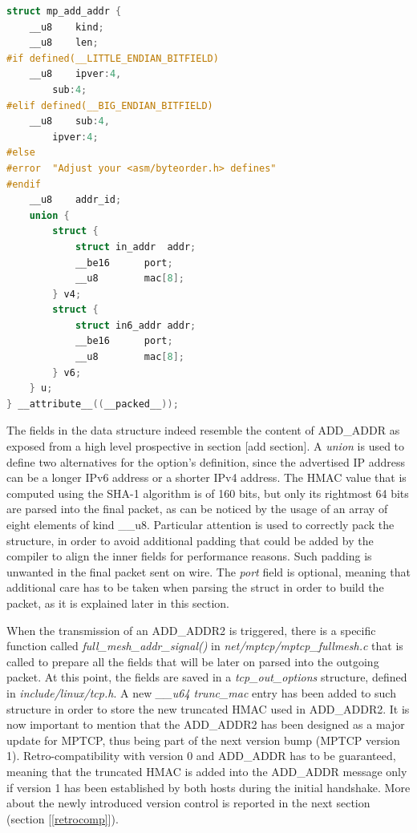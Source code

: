 \begin{lstlisting}[language=c, caption=\textit{mp\_add\_addr struct in the kernel}, label=mpaddaddr]
struct mp_add_addr {
	__u8	kind;
	__u8	len;
#if defined(__LITTLE_ENDIAN_BITFIELD)
	__u8	ipver:4,
		sub:4;
#elif defined(__BIG_ENDIAN_BITFIELD)
	__u8	sub:4,
		ipver:4;
#else
#error	"Adjust your <asm/byteorder.h> defines"
#endif
	__u8	addr_id;
	union {
		struct {
			struct in_addr	addr;
			__be16		port;
			__u8		mac[8];
		} v4;
		struct {
			struct in6_addr	addr;
			__be16		port;
			__u8		mac[8];
		} v6;
	} u;
} __attribute__((__packed__));
\end{lstlisting}

The fields in the data structure indeed resemble the content of ADD\_ADDR as exposed from a high level prospective in section [add section]. 
A \textit{union} is used to define two alternatives for the option's definition, since the advertised IP address can be a longer IPv6 address or a shorter IPv4 address. 
The HMAC value that is computed using the SHA-1 algorithm is of 160 bits, but only its rightmost 64 bits are parsed into the final packet, as can be noticed by the usage of an array of eight elements of kind \_\_u8.  
Particular attention is used to correctly pack the structure, in order to avoid additional padding that could be added by the compiler to align the inner fields for performance reasons. Such padding is unwanted in the final packet sent on wire. The \textit{port} field is optional, meaning that additional care has to be taken when parsing the struct in order to build the packet, as it is explained later in this section.


When the transmission of an ADD\_ADDR2 is triggered, there is a specific function called \textit{full\_mesh\_addr\_signal()} in \textit{net/mptcp/mptcp\_fullmesh.c} that is called to prepare all the fields that will be later on parsed into the outgoing packet. At this point, the fields are saved in a \textit{tcp\_out\_options} structure, defined in \textit{include/linux/tcp.h}. A new \textit{\_\_u64 trunc\_mac} entry has been added to such structure in order to store the new truncated HMAC used in ADD\_ADDR2. 
It is now important to mention that the ADD\_ADDR2 has been designed as a major update for MPTCP, thus being part of the next version bump (MPTCP version 1). Retro-compatibility with version 0 and ADD\_ADDR has to be guaranteed, meaning that the truncated HMAC is added into the ADD\_ADDR message only if version 1 has been established by both hosts during the initial handshake. More about the newly introduced version control is reported in the next section (section [\ref{retrocomp}]).

